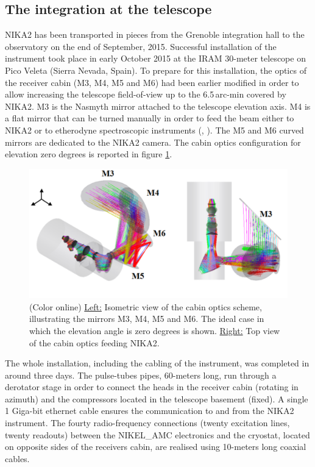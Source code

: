 \documentclass[]{aa} %
\begin{document}
\subsection{The integration at the telescope}
\label{The integration at the telescope}

NIKA2 has been transported in pieces from the Grenoble integration hall to the observatory on the end of September, 2015. Successful installation of the instrument took place in early October 2015 at the IRAM 30-meter telescope on Pico Veleta (Sierra Nevada, Spain). To prepare for this installation, the optics of the receiver cabin (M3, M4, M5 and M6) had been earlier modified in order to allow increasing the telescope field-of-view up to the 6.5\,arc-min covered by NIKA2. M3 is the Nasmyth mirror attached to the telescope elevation axis. M4 is a flat mirror that can be turned manually in order to feed the beam either to NIKA2 or to etherodyne spectroscopic instruments (\cite{Carter2012}, \cite{Schuster2004}). The M5 and M6 curved mirrors are dedicated to the NIKA2 camera. The cabin optics configuration for elevation zero degrees is reported in figure \ref{figCabin}. 

\begin{figure}[h]
   \centering
    \includegraphics[width=.85\linewidth]{figCabin.png}
      \caption{(Color online) \underline{Left:} Isometric view of the cabin optics scheme, illustrating the mirrors M3, M4, M5 and M6. The ideal case in which the elevation angle is zero degrees is shown. \underline{Right:} Top view of the cabin optics feeding NIKA2.}
         \label{figCabin}
\end{figure}

The whole installation, including the cabling of the instrument, was completed in around three days. The pulse-tubes pipes, 60-meters long, run through a derotator stage in order to connect the heads in the receiver cabin (rotating in azimuth) and the compressors located in the telescope basement (fixed). A single 1 Giga-bit ethernet cable ensures the communication to and from the NIKA2 instrument. The fourty radio-frequency connections (twenty excitation lines, twenty readouts) between the NIKEL\_AMC electronics and the cryostat, located on opposite sides of the receivers cabin, are realised using 10-meters long coaxial cables. 
\end{document}
